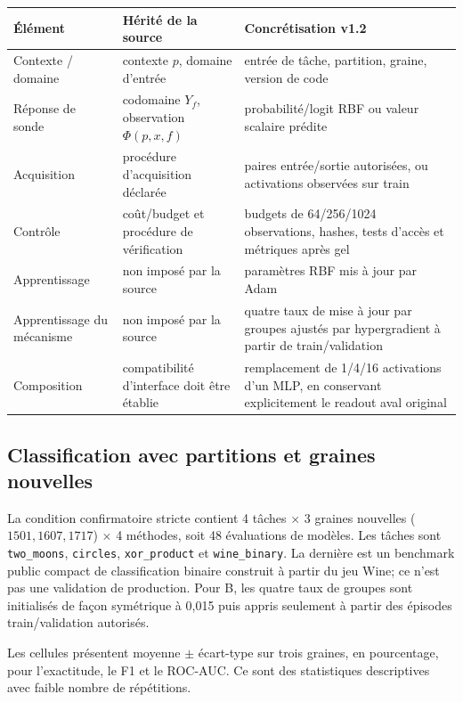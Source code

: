 \documentclass[11pt,a4paper]{article}
\begin{document}
\begin{longtable}{p{}p{}p{}}
\toprule
\textbf{Élément} & \textbf{Hérité de la source} & \textbf{Concrétisation v1.2}\\
\midrule\endhead
Contexte / domaine & contexte $p$, domaine d'entrée & entrée de tâche, partition, graine, version de code\\
Réponse de sonde & codomaine $Y_f$, observation $\Phi(p,x,f)$ & probabilité/logit RBF ou valeur scalaire prédite\\
Acquisition & procédure d'acquisition déclarée & paires entrée/sortie autorisées, ou activations observées sur train\\
Contrôle & coût/budget et procédure de vérification & budgets de 64/256/1024 observations, hashes, tests d'accès et métriques après gel\\
Apprentissage & non imposé par la source & paramètres RBF mis à jour par Adam\\
Apprentissage du mécanisme & non imposé par la source & quatre taux de mise à jour par groupes ajustés par hypergradient à partir de train/validation\\
Composition & compatibilité d'interface doit être établie & remplacement de 1/4/16 activations d'un MLP, en conservant explicitement le readout aval original\\
\bottomrule
\end{longtable}

\subsection{Classification avec partitions et graines nouvelles}
La condition confirmatoire stricte contient 4 tâches $\times$ 3 graines nouvelles ($1501,1607,1717$) $\times$ 4 méthodes, soit 48 évaluations de modèles. Les tâches sont \texttt{two\_moons}, \texttt{circles}, \texttt{xor\_product} et \texttt{wine\_binary}. La dernière est un benchmark public compact de classification binaire construit à partir du jeu Wine; ce n'est pas une validation de production. Pour B, les quatre taux de groupes sont initialisés de façon symétrique à 0,015 puis appris seulement à partir des épisodes train/validation autorisés.

Les cellules présentent moyenne $\pm$ écart-type sur trois graines, en pourcentage, pour l'exactitude, le F1 et le ROC-AUC. Ce sont des statistiques descriptives avec faible nombre de répétitions.
\end{document}
